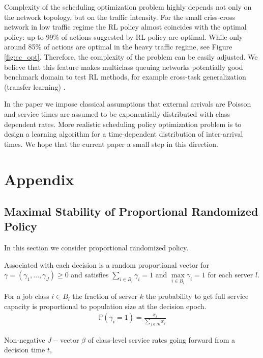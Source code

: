 \documentclass[11pt]{article}
\newcommand{\Prob}{\mathbb{P}}
\theoremstyle{definition}
\numberwithin{equation}{section}
\begin{document}
Complexity of the scheduling optimization problem highly depends not only on the network topology, but on the traffic intensity. For the small criss-cross network in low traffic regime the RL policy almost coincides with the optimal policy:  up to 99\% of actions suggested  by RL policy are optimal. While   only around 85\% of actions are optimal in the heavy traffic regime, see Figure \ref{fig:cc_opt}. Therefore, the complexity of the problem can be easily adjusted.  We believe that this feature makes multiclass queuing networks potentially  good benchmark domain to test RL methods, for example cross-task generalization (transfer learning)  \cite{Nichol2018}.



In the paper we impose classical assumptions that external arrivals are Poisson and service
times are assumed to be exponentially distributed with class-dependent rates. More realistic scheduling policy optimization problem  is to design a learning algorithm for a time-dependent distribution of inter-arrival times. We hope that the current paper a small step in this direction.




\section{Appendix}





\subsection{Maximal Stability of Proportional Randomized Policy}\label{sec:PR}

In this section we consider proportional randomized policy. 

Associated with each decision is a random proportional vector for $\gamma = (\gamma_1, ..., \gamma_J)\geq 0$ and satisfies $\sum\limits_{i\in B_l} \gamma_i =1$ and $\max\limits_{i\in B_l}\gamma_i =1$ for each server $l$.



For a job class $i\in B_l$ the fraction of server $k$ the probability to get full service capacity is proportional to population size at the decision epoch. 
\begin{align*}
\Prob(\gamma_i = 1) = \frac{x_i}{\sum\limits_{j\in B_l} x_j}
\end{align*}


Non-negative $J-$vector $\beta$ of class-level service rates going forward from a decision time $t$, 
\end{document}
